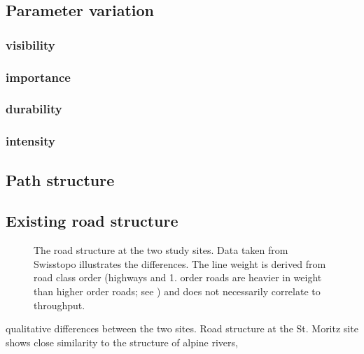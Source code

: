 \documentclass[a4paper, DIV11, abstracton]{scrartcl}
\begin{document}
\subsection{Parameter variation}

\subsubsection{visibility}

\subsubsection{importance}

\subsubsection{durability}

\subsubsection{intensity}


\subsection{Path structure}


\subsection{Existing road structure}

\begin{figure}[tbp]
	\caption{The road structure at the two study sites. Data taken from Swisstopo illustrates the differences. The line weight is derived from road class order (highways and 1. order roads are heavier in weight than higher order roads; see \citet{vector25}) and does not necessarily correlate to throughput.}
	\label{fig:roads}
\end{figure}

qualitative differences between the two sites. Road structure at the St. Moritz site shows close similarity to the structure of alpine rivers, 




\end{document}
